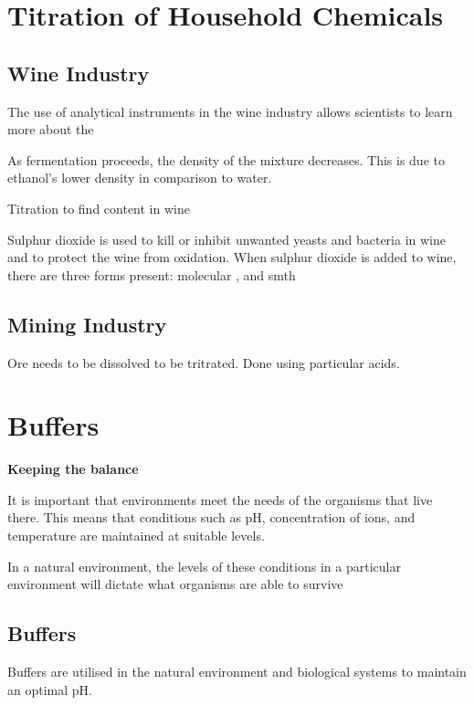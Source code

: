 \section{Titration of Household Chemicals} \label{27/03/2025}

	\subsection{Wine Industry}
		
		The use of analytical instruments in the wine industry allows scientists to learn more about the

		As fermentation proceeds, the density of the mixture decreases. This is due to ethanol's lower density in comparison to water.
	
		Titration to find  content in wine
		
		Sulphur dioxide is used to kill or inhibit unwanted yeasts and bacteria in wine and to protect the wine from oxidation. When sulphur dioxide is added to wine, there are three forms present: molecular ,  and smth

	\subsection{Mining Industry}
	
		Ore needs to be dissolved to be tritrated. Done using particular acids. 

\newpage

\section{Buffers} \label{07/04/2025}
	
	\textbf{Keeping the balance}
	
		It is important that environments meet the needs of the organisms that live there. This means that conditions such as pH, concentration of ions, and temperature are maintained at suitable levels.

		In a natural environment, the levels of these conditions in a particular environment will dictate what organisms are able to survive
	
	\subsection{Buffers}
	
		Buffers are utilised in the natural environment and biological systems to maintain an optimal pH.

